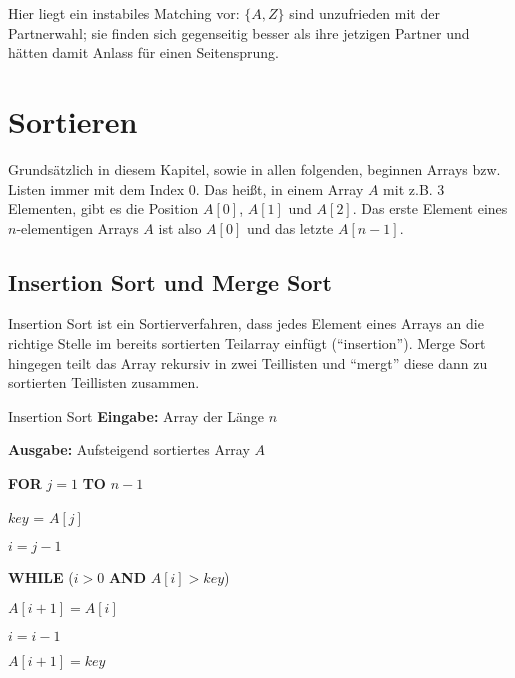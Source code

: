 \documentclass{panikzettel}
\newcommand\tab[1][1cm]{\hspace*{#1}}
\begin{document}
{\begin{halfboxr}
\begin{center}
		
		Hier liegt ein instabiles Matching vor: $\{A,Z\}$ sind unzufrieden mit der Partnerwahl; sie finden sich gegenseitig besser als ihre jetzigen Partner und hätten damit Anlass für einen Seitensprung.
	\end{center}
\end{halfboxr}

\section{Sortieren}

Grundsätzlich in diesem Kapitel, sowie in allen folgenden, beginnen Arrays bzw. Listen immer mit dem Index 0. Das heißt, in einem Array $A$ mit z.B. 3 Elementen, gibt es die Position $A[0]$, $A[1]$ und $A[2]$. Das erste Element eines $n$-elementigen Arrays $A$ ist also $A[0]$ und das letzte $A[n-1]$.

\subsection{Insertion Sort und Merge Sort}

Insertion Sort ist ein Sortierverfahren, dass jedes Element eines Arrays an die richtige Stelle im bereits sortierten Teilarray einfügt (``insertion''). Merge Sort hingegen teilt das Array rekursiv in zwei Teillisten und ``mergt'' diese dann zu sortierten Teillisten zusammen.

\begin{halfboxl}
	\vspace{-\baselineskip}
	\begin{algo}{Insertion Sort}
		\textbf{Eingabe:} Array der Länge $n$
		
		\textbf{Ausgabe:} Aufsteigend sortiertes Array $A$
		\tcblower
		
		\textbf{FOR} $j=1$ \textbf{TO} $n-1$
		
		\tab $key$ = $A[j]$
		
		\tab $i = j-1$
		
		\tab \textbf{WHILE} ($i>0$ \textbf{AND} $A[i]>key$)
		
		\tab\tab $A[i+1] = A[i]$
		
		\tab\tab $i =i-1$
		
		\tab $A[i+1] = key$
		

\end{algo}
\end{halfboxl}}
\end{document}

